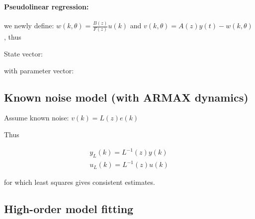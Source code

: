 \documentclass[10pt,a4paper]{scrartcl}
\begin{document}
\begin{multicols*}{2}
\paragraph{Pseudolinear regression:}


we newly define: $w(k,\theta) = \frac{B(z)}{F(z)}u(k)$ and $v(k,\theta) = A(z)y(t)-w(k,\theta)$, thus


State vector:


with parameter vector:


\subsection{Known noise model (with ARMAX dynamics)}

Assume known noise: $v(k)=L(z)e(k)$

Thus


\begin{align*}
y_L(k)=L^{-1}(z)y(k)\\
u_L(k)=L^{-1}(z)u(k)
\end{align*}


for which least squares gives consistent estimates.

\subsection{High-order model fitting}


\end{multicols*}
\end{document}
